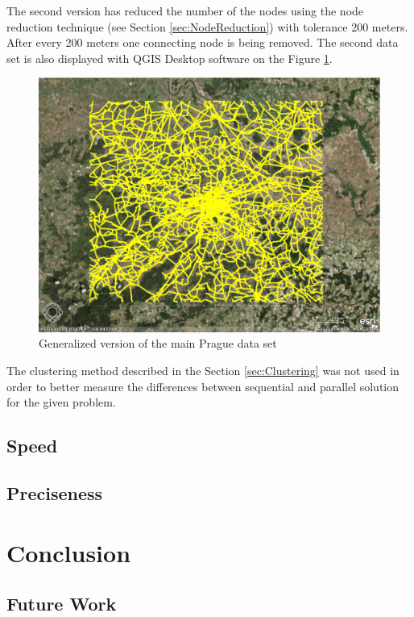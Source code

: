 \documentclass[thesis=M,english]{FITthesis}[2012/10/20]
\begin{document}
The second version has reduced the number of the nodes using the node reduction technique (see Section \ref{sec:NodeReduction}) with tolerance 200 meters. After every 200 meters one connecting node is being removed.
The second data set is also displayed with QGIS Desktop software on the Figure \ref{pic:dataset2}.
\begin{figure}[H]
\centering
\includegraphics[width=1\textwidth]{pics/praguedatasetS}
\caption{Generalized version of the main Prague data set}
\label{pic:dataset2}
\end{figure}

The clustering method described in the Section \ref{sec:Clustering} was not used in order to better measure the differences between sequential and parallel solution for the given problem. 

\section{Speed}

\section{Preciseness}

\chapter{Conclusion}

\section{Future Work}
\end{document}
